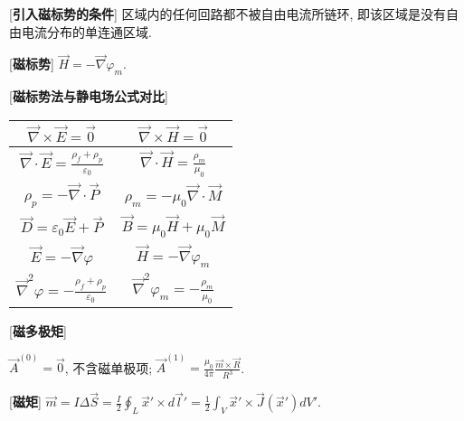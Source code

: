 [\textbf{引入磁标势的条件}] 区域内的任何回路都不被自由电流所链环, 即该区域是没有自由电流分布的单连通区域.\par

[\textbf{磁标势}] $\vec H=-\vec\nabla\varphi_m$.\par

[\textbf{磁标势法与静电场公式对比}]\par
\begin{table}[htb]\begin{center}\begin{tabular}{c c}
       \hline $\vec\nabla\times\vec E=\vec 0$&$\vec\nabla\times\vec H=\vec 0$\\
       \hline $\vec\nabla\cdot \vec E=\frac{\rho_f+\rho_p}{\varepsilon_0}$ & $\vec\nabla\cdot\vec H=\frac{\rho_m}{\mu_0} $ \\
       \hline $\rho_p=-\vec\nabla\cdot\vec P$ & $\rho_m=-\mu_0\vec\nabla\cdot\vec M$ \\
       \hline $\vec D=\varepsilon_0\vec E+\vec P$ & $\vec B=\mu_0\vec H+\mu_0\vec M$ \\
       \hline $\vec E=-\vec\nabla\varphi$ & $\vec H=-\vec\nabla\varphi_m$ \\
       \hline $\vec\nabla^2\varphi =-\frac{\rho_f+\rho_p}{\varepsilon_0}$ & $\vec\nabla^2\varphi_m=-\frac{\rho_m}{\mu_0}$ \\
       \hline
       \end{tabular}\end{center}\end{table}\par

[\textbf{磁多极矩}]\par
\qquad $\vec A^{(0)}=\vec 0$, 不含磁单极项; $\vec A^{(1)}=\frac{\mu_0}{4\pi}\frac{\vec m\times\vec R}{R^3}$.\par

[\textbf{磁矩}] $\vec m=I\Delta\vec S=\frac{I}{2}\oint_L\vec x'\times d\vec l'=\frac{1}{2}\int_V\vec x'\times\vec J(\vec x')dV'$.

\clearpage

